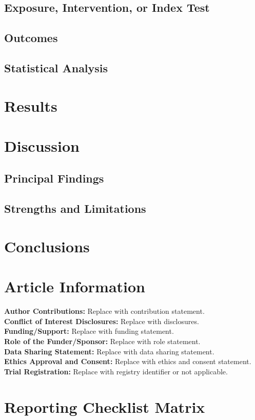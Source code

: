 \documentclass[11pt]{article}
\begin{document}
\subsection{Exposure, Intervention, or Index Test}

\subsection{Outcomes}

\subsection{Statistical Analysis}

\section{Results}

\section{Discussion}

\subsection{Principal Findings}

\subsection{Strengths and Limitations}

\section{Conclusions}

\section*{Article Information}
\textbf{Author Contributions:} Replace with contribution statement.\\
\textbf{Conflict of Interest Disclosures:} Replace with disclosures.\\
\textbf{Funding/Support:} Replace with funding statement.\\
\textbf{Role of the Funder/Sponsor:} Replace with role statement.\\
\textbf{Data Sharing Statement:} Replace with data sharing statement.\\
\textbf{Ethics Approval and Consent:} Replace with ethics and consent statement.\\
\textbf{Trial Registration:} Replace with registry identifier or not applicable.




\clearpage
\appendix
\section{Reporting Checklist Matrix}
\end{document}
